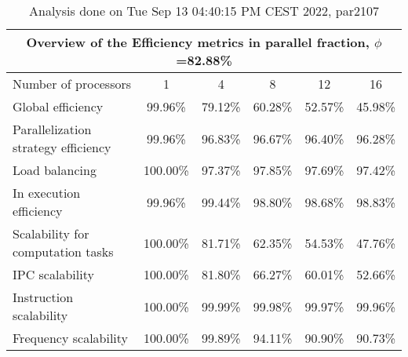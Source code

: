 \begin{table}[h]
\begin{center}
\begin{tabular}{|l|c|c|c|c|c|}
\hline
\multicolumn{6}{|c|}{Overview of the Efficiency metrics in parallel fraction, $\phi$=82.88\%} \\
\hline
\hline
Number of processors & 1 & 4 & 8 & 12 & 16 \\
\hline
\hline
Global efficiency                      &     99.96\% &     79.12\% &     60.28\% &     52.57\% &     45.98\% \\
\hline
\hline
Parallelization strategy efficiency &     99.96\% &     96.83\% &     96.67\% &     96.40\% &     96.28\% \\
\hline
Load balancing                   &    100.00\% &     97.37\% &     97.85\% &     97.69\% &     97.42\% \\
In execution efficiency          &     99.96\% &     99.44\% &     98.80\% &     98.68\% &     98.83\% \\
\hline
\hline
Scalability for computation tasks   &    100.00\% &     81.71\% &     62.35\% &     54.53\% &     47.76\% \\
\hline
IPC scalability                  &    100.00\% &     81.80\% &     66.27\% &     60.01\% &     52.66\% \\
Instruction scalability          &    100.00\% &     99.99\% &     99.98\% &     99.97\% &     99.96\% \\
Frequency scalability            &    100.00\% &     99.89\% &     94.11\% &     90.90\% &     90.73\% \\
\hline
\end{tabular}
\end{center}
\caption{ Analysis done on Tue Sep 13 04:40:15 PM CEST 2022, par2107}
\end{table}
